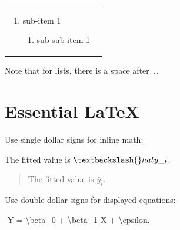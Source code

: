 \documentclass[
  letterpaper,
  DIV=11,
  numbers=noendperiod]{scrreprt}
\newenvironment{Shaded}{\begin{snugshade}}{\end{snugshade}}
\newcommand{\NormalTok}[1]{\textcolor[rgb]{0.00,0.23,0.31}{#1}}
\providecommand{\tightlist}{%
  \setlength{\itemsep}{0pt}\setlength{\parskip}{0pt}}
\theoremstyle{definition}
\theoremstyle{definition}
\theoremstyle{plain}
\theoremstyle{plain}
\theoremstyle{remark}
\begin{document}
{\begin{longtable}[]{@{}
  >{\raggedright\arraybackslash}p{}
  >{\raggedright\arraybackslash}p{}@{}}
\begin{minipage}[t]{\linewidth}
\begin{enumerate}
  \begin{enumerate}
  \def\labelenumii{\roman{enumii})}
  \tightlist
  \item
    sub-item 1

    \begin{enumerate}
    \def\labelenumiii{\Alph{enumiii}.}
    \tightlist
    \item
      sub-sub-item 1
    \end{enumerate}
  \end{enumerate}
\end{enumerate}
\end{minipage} \\
\end{longtable}
}

\begin{tcolorbox}[enhanced jigsaw, arc=.35mm, bottomrule=.15mm, bottomtitle=1mm, breakable, colback=white, colbacktitle=quarto-callout-tip-color!10!white, colframe=quarto-callout-tip-color-frame, coltitle=black, left=2mm, leftrule=.75mm, opacityback=0, opacitybacktitle=0.6, rightrule=.15mm, title=\textcolor{quarto-callout-tip-color}{\faLightbulb}\hspace{0.5em}{Tip}, titlerule=0mm, toprule=.15mm, toptitle=1mm]

Note that for lists, there is a space after \texttt{.}.

\end{tcolorbox}

\section{Essential LaTeX}\label{essential-latex}

Use single dollar signs for inline math:

\begin{Shaded}
\begin{Highlighting}[]
\NormalTok{The fitted value is $\textbackslash{}hat y\_i$.}
\end{Highlighting}
\end{Shaded}

\begin{quote}
The fitted value is \(\hat y_i\).
\end{quote}

Use double dollar signs for displayed equations:

\begin{Shaded}
\begin{Highlighting}[]
\NormalTok{$$}
\NormalTok{Y = \textbackslash{}beta\_0 + \textbackslash{}beta\_1 X + \textbackslash{}epsilon.}
\NormalTok{$$}
\end{Highlighting}
\end{Shaded}
\end{document}
